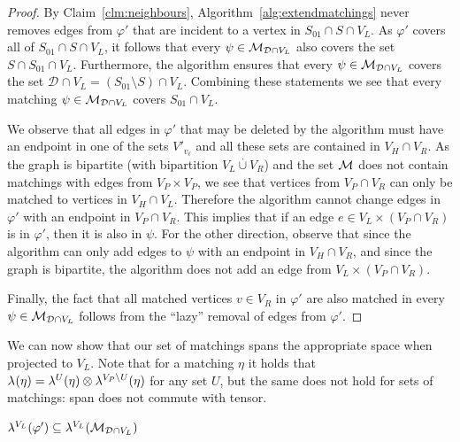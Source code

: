 \documentclass{article}
\newcommand{\disjointunion}{\overset{.}{\cup}}
\newcommand{\V}[1][]{V_{#1}}
\newcommand{\Vl}{\V[L]}
\newcommand{\Vr}{\V[R]}
\newcommand{\Vp}{\V[P]}
\newcommand{\Vh}{\V[H]}
\newcommand{\linmap}[1][]{\ensuremath \lambda_{{#1}}}
\newcommand{\linmapof}[2][]{\linmap[#1](#2)}
\newcommand{\linmapl}[2][]{\ensuremath \lambda^{{#2}}_{{#1}}}
\newcommand{\linmaplof}[3][]{\linmapl[#1]{#2}(#3)}
\newcommand{\diffclosure}[1][]{D_{{#1}}}
\renewcommand{\diffclosure}[1][]{\mathcal{D}_{{#1}}}
\newcommand{\matchb}{\varphi'}
\newcommand{\matchc}{\psi}
\newcommand{\matche}{\eta}
\newcommand{\matchings}[1][]{\ensuremath \mathcal{M}_{{#1}}}
\newcommand{\tensor}{\ensuremath \otimes}
\numberwithin{equation}{section}
\begin{document}
\begin{proof}
  By Claim~\ref{clm:neighbours}, 
  Algorithm~\ref{alg:extendmatchings} never removes edges from $\matchb$
  that are incident to
  a vertex in $S_{01} \cap S \cap \Vl$. As 
  $\matchb$ covers all of $S_{01} \cap S \cap \Vl$,
  it follows that every
  $\matchc \in \matchings[\diffclosure \cap \Vl]$ also covers the set
  $S \cap S_{01} \cap \Vl$. 
  Furthermore, the algorithm ensures that every 
  $\matchc \in \matchings[\diffclosure \cap \Vl]$
  covers the set $\diffclosure \cap \Vl = (S_{01} \setminus S) \cap
  \Vl$.
  Combining these statements we see that every matching
  $\matchc \in \matchings[\diffclosure \cap \Vl]$ covers
  $S_{01} \cap \Vl$.
  
  We observe that all edges in $\matchb$ that
  may be deleted by the algorithm must have an endpoint in one of the
  sets $V'_{v_\ell}$ and all these sets are contained in
  $\Vh \cap \Vr$. As the graph is bipartite (with bipartition
  $\Vl \disjointunion \Vr$) and the set $\matchings$ does not contain
  matchings with edges from $\Vp \times \Vp$, we see that vertices from
  $\Vp \cap \Vr$ can only be matched to vertices in
  $\Vh \cap\Vl$.
  Therefore the algorithm cannot change edges in $\matchb$ with
  an endpoint in $\Vp \cap \Vr$.
  This implies that if an edge $e \in \Vl \times (\Vp \cap \Vr)$ is in $\matchb$, then it is also in $\matchc$.
  For the other direction, observe that since the algorithm can only add
  edges to $\matchc$ with an endpoint in $\Vh \cap \Vr$, and since the graph
is bipartite, the algorithm does not add an edge from $ \Vl \times (\Vp \cap \Vr)$.

  Finally, the fact that all matched vertices $v \in \Vr$ in $\matchb$ are also matched
  in every $\matchc \in \matchings[\diffclosure \cap \Vl]$ 
  follows from the ``lazy'' removal of edges from $\matchb$.
\end{proof}

We can now show that our set of matchings spans the appropriate space
when projected to $\Vl$.
Note that for a matching $\matche$ it holds that
$\linmapof{\matche} = \linmaplof{U}{\matche} \tensor \linmaplof{\Vp
  \setminus U}{\matche}$ for any set  $U$, but the same does not hold
for sets of matchings: span does not commute with tensor.

\begin{claim}\label{clm:span_matchings}
  $
    \linmaplof{\Vl}{\matchb}
    \subseteq
    \linmaplof{\Vl}{\matchings[\diffclosure \cap \Vl]}
  $
\end{claim}
\end{document}
